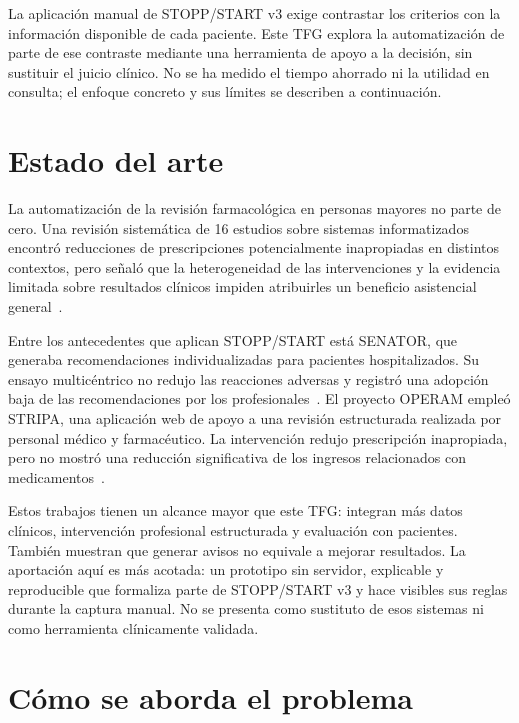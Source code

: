 La aplicación manual de STOPP/START v3 exige contrastar los criterios con la
información disponible de cada paciente. Este TFG explora la automatización de parte
de ese contraste mediante una herramienta de apoyo a la decisión, sin sustituir el
juicio clínico. No se ha medido el tiempo ahorrado ni la utilidad en consulta; el
enfoque concreto y sus límites se describen a continuación.

\section{Estado del arte}
\label{sec:estado-arte}

La automatización de la revisión farmacológica en personas mayores no parte
de cero. Una revisión sistemática de 16 estudios sobre sistemas
informatizados encontró reducciones de prescripciones potencialmente
inapropiadas en distintos contextos, pero señaló que la heterogeneidad de
las intervenciones y la evidencia limitada sobre resultados clínicos
impiden atribuirles un beneficio asistencial general~\cite{monteiro2019cdss}.

Entre los antecedentes que aplican STOPP/START está SENATOR, que generaba
recomendaciones individualizadas para pacientes hospitalizados. Su ensayo
multicéntrico no redujo las reacciones adversas y registró una adopción baja
de las recomendaciones por los profesionales~\cite{omahony2020senator}.
El proyecto OPERAM empleó STRIPA, una aplicación web de apoyo a una revisión
estructurada realizada por personal médico y farmacéutico. La intervención
redujo prescripción inapropiada, pero no mostró una reducción significativa
de los ingresos relacionados con medicamentos~\cite{blum2021operam}.

Estos trabajos tienen un alcance mayor que este TFG: integran más datos
clínicos, intervención profesional estructurada y evaluación con pacientes.
También muestran que generar avisos no equivale a mejorar resultados. La
aportación aquí es más acotada: un prototipo sin servidor, explicable y
reproducible que formaliza parte de STOPP/START v3 y hace visibles sus reglas
durante la captura manual. No se presenta como sustituto de esos sistemas ni
como herramienta clínicamente validada.

\section{Cómo se aborda el problema}
\label{sec:abordaje}

